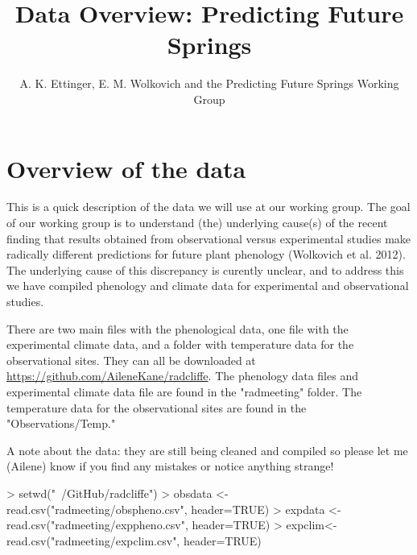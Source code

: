 \documentclass{article}
\begin{document}
% 
\title{Data Overview: Predicting Future Springs} %
\author{A. K. Ettinger, E. M. Wolkovich and the Predicting Future Springs Working Group}
\maketitle  %
\section {Overview of the data}

This is a quick description of the data we will use at our working group. The goal of our working group is to understand (the) underlying cause(s) of the recent finding that results obtained from observational versus experimental studies make radically different predictions for future plant phenology (Wolkovich et al. 2012). The underlying cause of this discrepancy is curently unclear, and to address this we have compiled phenology and climate data for experimental and observational studies. 

There are two main files with the phenological data, one file with the experimental climate data, and a folder with temperature data for the observational sites. They can all be downloaded at \url{https://github.com/AileneKane/radcliffe}. The phenology data files and experimental climate data file are found in the "radmeeting" folder. The temperature data for the observational sites are found in the "Observations/Temp."

A note about the data: they are still being cleaned and compiled so please let me (Ailene) know if you find any mistakes or notice anything strange! 

\begin{Schunk}
\begin{Sinput}
> setwd("~/GitHub/radcliffe")
> obsdata <- read.csv("radmeeting/obspheno.csv", header=TRUE)
> expdata <- read.csv("radmeeting/exppheno.csv", header=TRUE)
> expclim<-read.csv("radmeeting/expclim.csv", header=TRUE)
\end{Sinput}
\end{Schunk}
\end{document}
